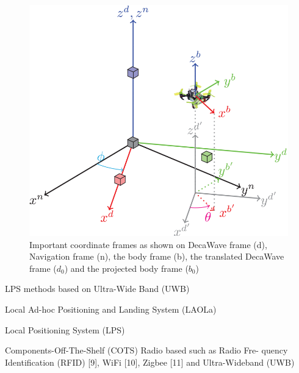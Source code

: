 \begin{figure} [H]
	\centering
	\includegraphics[width=0.6\linewidth]{Images/Related-Work/body-frames.png}
	\decoRule
	\caption[Important coordinate frames]{Important coordinate frames as shown on \cite{uwb-imu-gps2} DecaWave frame (d), Navigation frame (n), the body frame (b), the translated DecaWave frame ($d_0$) and the projected body frame ($b_0$)}
	\label{fig:Important-coordinate-frames}
\end{figure}
LPS methods based on Ultra-Wide Band (UWB)

Local Ad-hoc Positioning and Landing
System (LAOLa)

Local Positioning System (LPS)


Components-Off-The-Shelf (COTS)
Radio based
such as Radio Fre-
quency Identification (RFID) [9], WiFi [10], Zigbee [11] and
Ultra-Wideband (UWB)
        

        


\cite{6907551}
\cite{inproceedings51}



